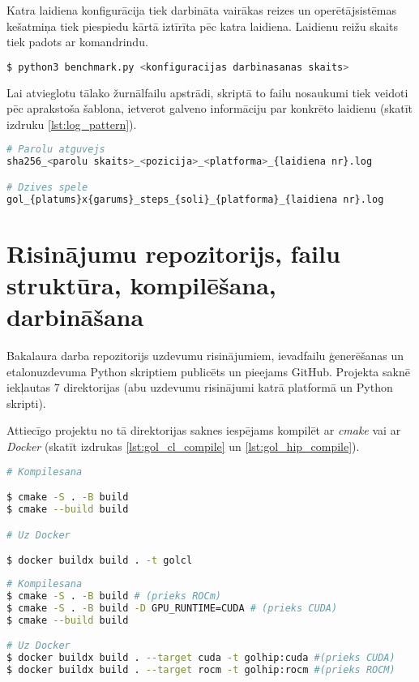 Katra laidiena konfigurācija tiek darbināta vairākas reizes un operētājsistēmas
kešatmiņa tiek piespiedu kārtā iztīrīta pēc katra laidiena. Laidienu reižu
skaits tiek padots ar komandrindu.

\begin{lstlisting}[caption={Etalonuzdevumu darbināšanas Python skripta darbināšana},
    captionpos=b,
    label=lst:bench_cli, language=bash]
$ python3 benchmark.py <konfiguracijas darbinasanas skaits>
\end{lstlisting}

Lai atvieglotu tālako žurnālfailu apstrādi, skriptā to failu nosaukumi tiek
veidoti pēc aprakstoša šablona, ietverot galveno informāciju par konkrēto
laidienu (skatīt izdruku \ref{lst:log_pattern}).
\begin{lstlisting}[caption={Žurnālfailu nosaukumu šabloni},
    captionpos=b,
    label=lst:log_pattern, language=bash]
# Parolu atguvejs
sha256_<parolu skaits>_<pozicija>_<platforma>_{laidiena nr}.log

# Dzives spele
gol_{platums}x{garums}_steps_{soli}_{platforma}_{laidiena nr}.log
\end{lstlisting}




\section{Risinājumu repozitorijs, failu struktūra, kompilēšana, darbināšana}
Bakalaura darba repozitorijs uzdevumu risinājumiem, ievadfailu ģenerēšanas un
etalonuzdevuma Python skriptiem publicēts un pieejams
GitHub.\cite{bak_github_repo} Projekta saknē iekļautas 7 direktorijas (abu
uzdevumu risinājumi katrā platformā un Python skripti).

Attiecīgo projektu no tā direktorijas saknes iespējams kompilēt ar \textit{cmake}
vai ar \textit{Docker} (skatīt izdrukas \ref{lst:gol_cl_compile} un \ref{lst:gol_hip_compile}).

\begin{lstlisting}[caption={OpenCL un CUDA risinājumu kompilēšana},
    captionpos=b,
    label=lst:gol_cl_compile, language=bash]
# Kompilesana

$ cmake -S . -B build
$ cmake --build build

# Uz Docker

$ docker buildx build . -t golcl
\end{lstlisting}

\begin{lstlisting}[caption={ROCm HIP risinājumu kompilēšana},
    captionpos=b,
    label=lst:gol_hip_compile, language=bash]
# Kompilesana 
$ cmake -S . -B build # (prieks ROCm)
$ cmake -S . -B build -D GPU_RUNTIME=CUDA # (prieks CUDA)
$ cmake --build build

# Uz Docker
$ docker buildx build . --target cuda -t golhip:cuda #(prieks CUDA)
$ docker buildx build . --target rocm -t golhip:rocm #(prieks ROCM)
\end{lstlisting}


